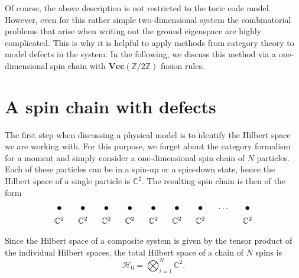 Of course, the above description is not restricted to the toric code model. However, even for this rather simple two-dimensional system the combinatorial problems that arise when writing out the ground eigenspace are highly complicated. This is why it is helpful to apply methods from category theory to model defects in the system. In the following, we discuss this method via a one-dimensional spin chain with $\mathbf{Vec}(\mathbb{Z}/2\mathbb{Z})$ fusion rules.


\section{A spin chain with defects}
\label{sec:Hilbertspace}

The first step when discussing a physical model is to identify the Hilbert space we are working with. For this purpose, we forget about the category formalism for a moment and simply consider a one-dimensional spin chain of $N$ particles. Each of these particles can be in a spin-up or a spin-down state, hence the Hilbert space of a single particle is $\mathbb{C}^2$. The resulting spin chain is then of the form
	\begin{equation}
		\begin{tikzpicture}
			\foreach \a in {0,1,...,6}{
				\node at (\a,0) {\large $\bullet$};	
			}
			\node at (7,0) {$\dots$};
			\node at (8,0) {\large $\bullet$};
			\foreach \a in {0,1,...,6}{
				\node at (\a,-0.5) {$\mathbb{C}^2$};	
			}
			\node at (8,-0.5) {$\mathbb{C}^2$};
		\end{tikzpicture}
	\end{equation}
Since the Hilbert space of a composite system is given by the tensor product of the individual Hilbert spaces, the total Hilbert space of a chain of $N$ spins is
	\begin{equation}
		\mathcal{H}_0=\bigotimes_{i=1}^N\mathbb{C}^2.
	\end{equation}

